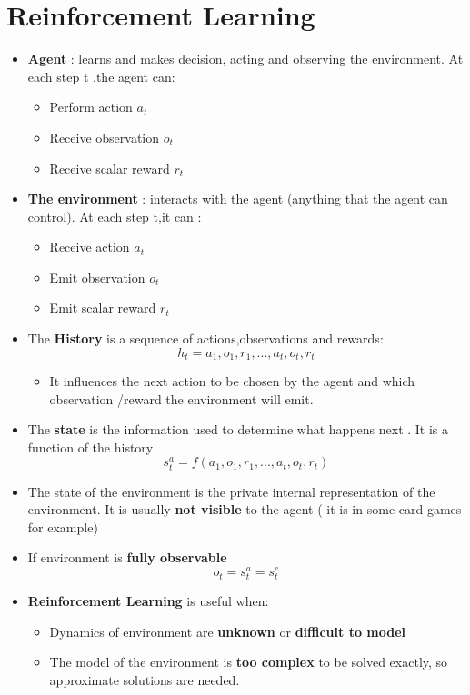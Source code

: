 \documentclass[12pt]{article} %
\begin{document}
\section{Reinforcement Learning}
\begin{itemize}
\item \textbf{Agent} : learns and makes decision, acting and observing the environment. At each step t ,the agent can:
\begin{itemize}
\item Perform action $a_t$
\item Receive observation $o_t$
\item Receive scalar reward $r_t$
\end{itemize}
\item \textbf{The environment} : interacts with the agent (anything that the agent can control). At each step t,it can :
\begin{itemize}
\item Receive action $a_t$
\item Emit observation $o_t$
\item Emit scalar reward $r_t$
\end{itemize}
\item The \textbf{History} is a sequence of actions,observations and rewards: 
$$ h_t= a_1,o_1,r_1, ... ,a_t,o_t,r_t$$
\begin{itemize}
\item It influences the next action to be chosen by the agent and which observation /reward the environment will emit.
\end{itemize}
\item The \textbf{state} is the information used to determine what happens next . It is a function of the history 
$$ s_t^a = f(a_1,o_1,r_1, ... ,a_t,o_t,r_t)$$
\item The state of the environment is the private internal representation of the environment. It is usually \textbf{not visible} to the agent ( it is in some card games for example)

\item If environment is \textbf{fully observable}
$$ o_t=s_t^a=s_t^e$$

\item \textbf{Reinforcement Learning} is useful when:
\begin{itemize}
\item Dynamics of environment  are \textbf{unknown} or \textbf{difficult to model}
\item The model of the environment is \textbf{too complex } to be solved exactly, so approximate solutions are needed.
\end{itemize}
\end{itemize}
\end{document}

